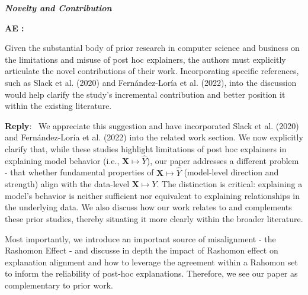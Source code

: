 \documentclass[11pt]{article}
\newcounter{se}[section]
\newcounter{aed}[section]
\newenvironment{aed}[1][]{%
    \refstepcounter{aed}\par\medskip\noindent%
    \textbf{AE \theaed: #1}\rmfamily\itshape%
}{\medskip}
\newenvironment{reply}
 {\par\medskip \noindent \begin{sf}\textbf{Reply}:\ }
 {\medskip \end{sf}}
\begin{document}
\noindent \textbf{\textit{Novelty and Contribution}}
\begin{aed}
    Given the substantial body of prior research in computer science and business on the limitations and misuse of post hoc explainers, the authors must explicitly articulate the novel contributions of their work. Incorporating specific references, such as Slack et al. (2020) and Fernández-Loría et al. (2022), into the discussion would help clarify the study's incremental contribution and better position it within the existing literature.
\end{aed}
\begin{reply}
We appreciate this suggestion and have incorporated Slack et al. (2020) and Fernández-Loría et al. (2022) into the related work section. We now explicitly clarify that, while these studies highlight limitations of post hoc explainers in explaining model behavior (i.e., $\mathbf{X}\mapsto \hat{Y}$), our paper addresses a different problem - that whether fundamental properties of $\mathbf{X} \mapsto \hat{Y}$ (model-level direction and strength) align with the data-level $\mathbf{X} \mapsto Y$.  The distinction is critical: explaining a model’s behavior is neither sufficient nor equivalent to explaining relationships in the underlying data. We also discuss how our work relates to and complements these prior studies, thereby situating it more clearly within the broader literature.

Most importantly, we introduce an important source of misalignment - the Rashomon Effect - and discusse in depth the impact of Rashomon effect on explanation alignment and how to leverage the agreement within a Rahomon set to inform the reliability of post-hoc explanations. Therefore, we see our paper as complementary to prior work.
\end{reply}
\end{document}
